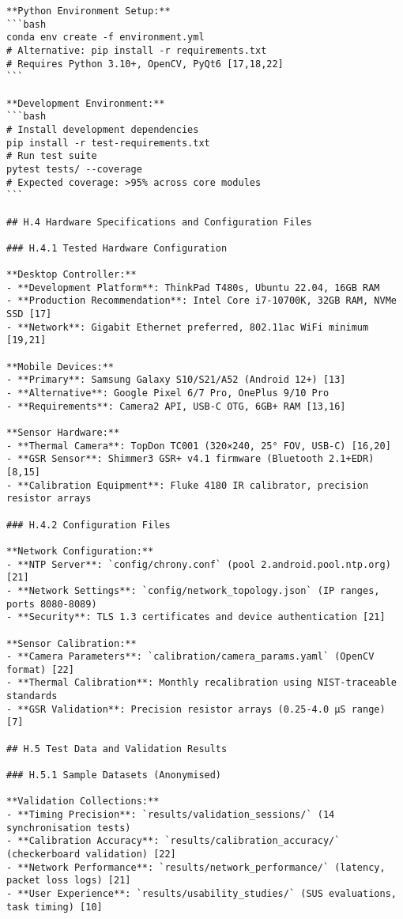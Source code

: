 \begin{verbatim}
**Python Environment Setup:**
```bash
conda env create -f environment.yml
# Alternative: pip install -r requirements.txt
# Requires Python 3.10+, OpenCV, PyQt6 [17,18,22]
```

**Development Environment:**
```bash
# Install development dependencies
pip install -r test-requirements.txt
# Run test suite
pytest tests/ --coverage
# Expected coverage: >95% across core modules
```

## H.4 Hardware Specifications and Configuration Files

### H.4.1 Tested Hardware Configuration

**Desktop Controller:**
- **Development Platform**: ThinkPad T480s, Ubuntu 22.04, 16GB RAM
- **Production Recommendation**: Intel Core i7-10700K, 32GB RAM, NVMe SSD [17]
- **Network**: Gigabit Ethernet preferred, 802.11ac WiFi minimum [19,21]

**Mobile Devices:**
- **Primary**: Samsung Galaxy S10/S21/A52 (Android 12+) [13]
- **Alternative**: Google Pixel 6/7 Pro, OnePlus 9/10 Pro
- **Requirements**: Camera2 API, USB-C OTG, 6GB+ RAM [13,16]

**Sensor Hardware:**
- **Thermal Camera**: TopDon TC001 (320×240, 25° FOV, USB-C) [16,20]
- **GSR Sensor**: Shimmer3 GSR+ v4.1 firmware (Bluetooth 2.1+EDR) [8,15]
- **Calibration Equipment**: Fluke 4180 IR calibrator, precision resistor arrays

### H.4.2 Configuration Files

**Network Configuration:**
- **NTP Server**: `config/chrony.conf` (pool 2.android.pool.ntp.org) [21]
- **Network Settings**: `config/network_topology.json` (IP ranges, ports 8080-8089)
- **Security**: TLS 1.3 certificates and device authentication [21]

**Sensor Calibration:**
- **Camera Parameters**: `calibration/camera_params.yaml` (OpenCV format) [22]
- **Thermal Calibration**: Monthly recalibration using NIST-traceable standards
- **GSR Validation**: Precision resistor arrays (0.25-4.0 μS range) [7]

## H.5 Test Data and Validation Results

### H.5.1 Sample Datasets (Anonymised)

**Validation Collections:**
- **Timing Precision**: `results/validation_sessions/` (14 synchronisation tests)
- **Calibration Accuracy**: `results/calibration_accuracy/` (checkerboard validation) [22]
- **Network Performance**: `results/network_performance/` (latency, packet loss logs) [21]
- **User Experience**: `results/usability_studies/` (SUS evaluations, task timing) [10]


\end{verbatim}
